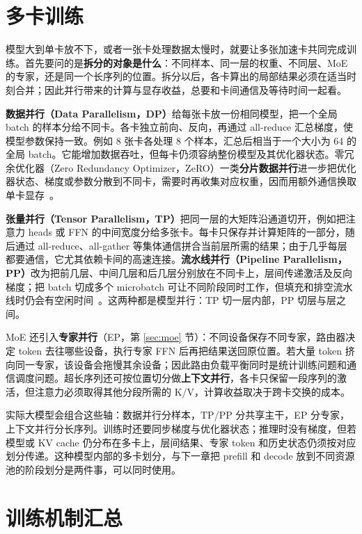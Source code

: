 \section{多卡训练}
\label{sec:distributed-training}

模型大到单卡放不下，或者一张卡处理数据太慢时，就要让多张加速卡共同完成训练。首先要问的是\textbf{拆分的对象是什么}：不同样本、同一层的权重、不同层、MoE 的专家，还是同一个长序列的位置。拆分以后，各卡算出的局部结果必须在适当时刻合并；因此并行带来的计算与显存收益，总要和卡间通信及等待时间一起看。

\textbf{数据并行（Data Parallelism，DP）}给每张卡放一份相同模型，把一个全局 batch 的样本分给不同卡。各卡独立前向、反向，再通过 all-reduce 汇总梯度，使模型参数保持一致。例如 8 张卡各处理 8 个样本，汇总后相当于一个大小为 64 的全局 batch。它能增加数据吞吐，但每卡仍须容纳整份模型及其优化器状态。零冗余优化器（Zero Redundancy Optimizer，ZeRO）一类\textbf{分片数据并行}进一步把优化器状态、梯度或参数分散到不同卡，需要时再收集对应权重，因而用额外通信换取单卡显存~\cite{rajbhandari2020zero}。

\textbf{张量并行（Tensor Parallelism，TP）}把同一层的大矩阵沿通道切开，例如把注意力 heads 或 FFN 的中间宽度分给多张卡。每卡只保存并计算矩阵的一部分，随后通过 all-reduce、all-gather 等集体通信拼合当前层所需的结果；由于几乎每层都要通信，它尤其依赖卡间的高速连接。\textbf{流水线并行（Pipeline Parallelism，PP）}改为把前几层、中间几层和后几层分别放在不同卡上，层间传递激活及反向梯度；把 batch 切成多个 microbatch 可让不同阶段同时工作，但填充和排空流水线时仍会有空闲时间~\cite{shoeybi2019megatron}。这两种都是模型并行：TP 切一层内部，PP 切层与层之间。

MoE 还引入\textbf{专家并行}（EP，第 \ref{sec:moe} 节）：不同设备保存不同专家，路由器决定 token 去往哪些设备，执行专家 FFN 后再把结果送回原位置。若大量 token 挤向同一专家，该设备会拖慢其余设备；因此路由负载平衡同时是统计训练问题和通信调度问题。超长序列还可按位置切分做\textbf{上下文并行}，各卡只保留一段序列的激活，但注意力必须取得其他分段所需的 K/V，计算收益取决于跨卡交换的成本。

实际大模型会组合这些轴：数据并行分样本，TP/PP 分共享主干，EP 分专家，上下文并行分长序列。训练时还要同步梯度与优化器状态；推理时没有梯度，但若模型或 KV cache 仍分布在多卡上，层间结果、专家 token 和历史状态仍须按对应划分传递。这种模型内部的多卡划分，与下一章把 prefill 和 decode 放到不同资源池的阶段划分是两件事，可以同时使用。

\clearpage
\section{训练机制汇总}

